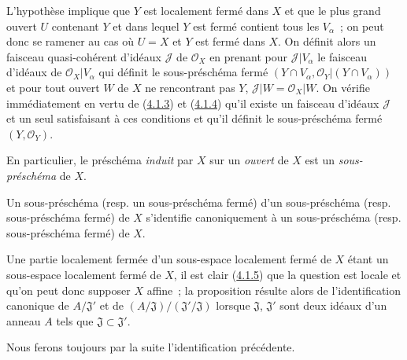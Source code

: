 L'hypothèse implique que $Y$ est localement fermé dans $X$ et que le plus
grand ouvert $U$ contenant $Y$ et dans lequel $Y$ est fermé contient tous les
$V_\alpha$~; on peut donc se ramener au cas où $U=X$ et $Y$ est fermé dans
$X$. On définit alors un faisceau quasi-cohérent d'idéaux $\mathscr{J}$ de
$\mathscr{O}_X$ en prenant pour $\mathscr{J}|V_\alpha$ le faisceau d'idéaux de
$\mathscr{O}_X|V_\alpha$ qui définit le sous-préschéma fermé
$(Y\cap V_\alpha,\mathscr{O}_Y|(Y\cap V_\alpha))$ et pour tout ouvert $W$ de
$X$ ne rencontrant pas $Y$, $\mathscr{J}|W=\mathscr{O}_X|W$. On vérifie
immédiatement en vertu de (\hyperref[I.4.1.3-fr]{4.1.3}) et
(\hyperref[I.4.1.4-fr]{4.1.4}) qu'il existe un faisceau d'idéaux $\mathscr{J}$
et un seul satisfaisant à ces conditions et qu'il définit le sous-préschéma
fermé $(Y,\mathscr{O}_Y)$.

En particulier, le préschéma \emph{induit} par $X$ sur un \emph{ouvert} de
$X$ est un \emph{sous-préschéma} de $X$.

\begin{proposition}[4.1.6]
\label{I.4.1.6-fr}
Un sous-préschéma (\textup{resp.} un sous-préschéma fermé) d'un
sous-préschéma (\textup{resp.} sous-préschéma fermé) de $X$
s'identifie canoniquement à un sous-préschéma (\textup{resp.} sous-préschéma fermé) de
$X$.
\end{proposition}

Une partie localement fermée d'un sous-espace localement fermé de $X$ étant
un sous-espace localement fermé de $X$, il est clair
(\hyperref[I.4.1.5-fr]{4.1.5}) que la question est locale et qu'on peut donc
supposer $X$ affine~; la proposition résulte alors de l'identification
canonique de $A/\mathfrak{J}'$ et de
$(A/\mathfrak{J})/(\mathfrak{J}'/\mathfrak{J})$ lorsque
$\mathfrak{J}$, $\mathfrak{J}'$ sont deux idéaux d'un anneau $A$ tels que
$\mathfrak{J}\subset\mathfrak{J}'$.

Nous ferons toujours par la suite l'identification précédente.

